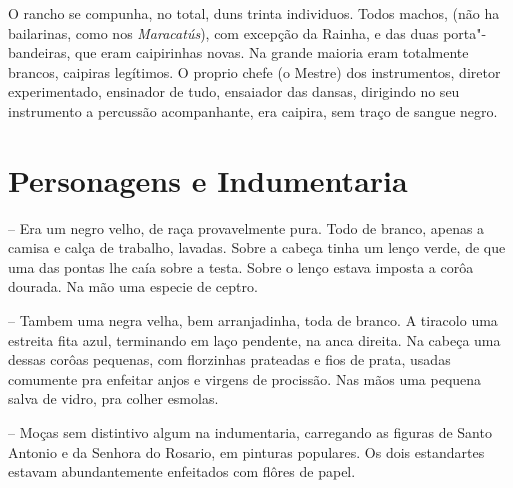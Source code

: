 O rancho se compunha, no total, duns trinta individuos. Todos machos,
(não ha bailarinas, como nos \emph{Maracatús}), com excepção da Rainha,
e das duas porta"-bandeiras, que eram caipirinhas novas. Na grande
maioria eram totalmente brancos, caipiras legítimos. O proprio chefe (o
Mestre) dos instrumentos, diretor experimentado, ensinador de tudo,
ensaiador das dansas, dirigindo no seu instrumento a percussão
acompanhante, era caipira, sem traço de sangue negro.

\section{Personagens e Indumentaria}

 -- Era um negro velho, de raça provavelmente pura. Todo de
branco, apenas a camisa e calça de trabalho, lavadas. Sobre a cabeça
tinha um lenço verde, de que uma das pontas lhe caía sobre a testa.
Sobre o lenço estava imposta a corôa dourada. Na mão uma especie de
ceptro.

 -- Tambem uma negra velha, bem arranjadinha, toda de
branco. A tiracolo uma estreita fita azul, terminando em laço pendente,
na anca direita. Na cabeça uma dessas corôas pequenas, com florzinhas
prateadas e fios de prata, usadas comumente pra enfeitar anjos e virgens
de procissão. Nas mãos uma pequena salva de vidro, pra colher esmolas.

 -- Moças sem distintivo algum na
indumentaria, carregando as figuras de Santo Antonio e da Senhora do
Rosario, em pinturas populares. Os dois estandartes estavam
abundantemente enfeitados com flôres de papel.

